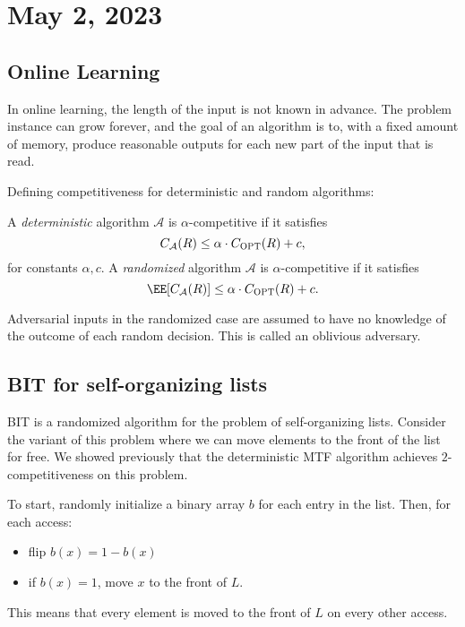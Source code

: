 \section{May 2, 2023}

\subsection{Online Learning}

\begin{definition}

In online learning, the length of the input is not known in advance. The problem instance can grow forever, and the goal of an algorithm is to, with a fixed amount of memory, produce reasonable outputs for each new part of the input that is read. 
\end{definition}

Defining competitiveness for deterministic and random algorithms: 

\begin{definition}

A \textit{deterministic} algorithm $\mathcal{A}$ is $\alpha$-competitive if it satisfies 
\[C_{\mathcal{A}}(R)\leq \alpha \cdot C_{\textsc{OPT}}(R) + c,\]
for constants $\alpha,c$. A \textit{randomized} algorithm $\mathcal{A}$ is $\alpha$-competitive if it satisfies
\[\EE[C_{\mathcal{A}}(R)]\leq \alpha \cdot C_{\textsc{OPT}}(R) + c.\]
\end{definition}

Adversarial inputs in the randomized case are assumed to have no knowledge of the outcome of each random decision. This is called an \ac{oblivious adversary}.

\subsection{BIT for self-organizing lists}

BIT is a randomized algorithm for the problem of self-organizing lists. Consider the variant of this problem where we can move elements to the front of the list for free. We showed previously that the deterministic MTF algorithm achieves $2$-competitiveness on this problem.

To start, randomly initialize a binary array $b$ for each entry in the list. Then, for each access:
\begin{itemize}
    \item flip $b(x) = 1-b(x)$
    \item if $b(x)=1$, move $x$ to the front of $L$.
\end{itemize}
This means that every element is moved to the front of $L$ on every other access. 

